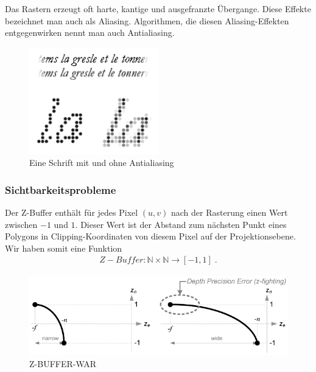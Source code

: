 Das Rastern erzeugt oft harte, kantige und ausgefranzte Übergange. Diese Effekte bezeichnet man auch als Aliasing. Algorithmen, die diesen Aliasing-Effekten entgegenwirken nennt man auch 
Antialiasing. 
\begin{figure}[H]
    \centering
    \includegraphics[width=0.5\textwidth]{images/Antialiasing.png}
    \caption{Eine Schrift mit und ohne Antialiasing}
    \label{fig:gimbal+lock}
\end{figure}


\subsubsection*{Sichtbarkeitsprobleme}
\begin{Definition}[Clipping]
\end{Definition}

\begin{Definition}[z-Buffer]
Der Z-Buffer enthält für jedes Pixel $(u,v)$ nach der Rasterung  einen Wert zwischen $-1$ und $1$. Dieser Wert  ist der Abstand zum nächsten Punkt eines Polygons  in Clipping-Koordinaten von diesem Pixel auf der Projektionsebene.  Wir haben somit eine Funktion
\begin{align*}
Z-Buffer : \mathbb{N} \times \mathbb{N} \to [-1,1]  \; .
\end{align*}
\end{Definition}

\begin{figure}[H]
    \centering
    \includegraphics[width=1.0\textwidth]{images/gl_projectionmatrix_zbuffer_1.png}
    \caption{Z-BUFFER-WAR}
\end{figure}



